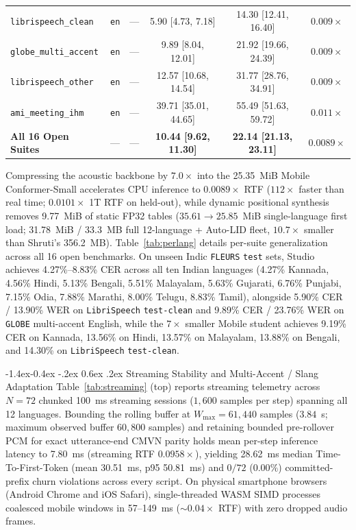 \documentclass[10pt,twocolumn]{article}
\makeatletter
\renewcommand\subsection{\@startsection{subsection}{2}{\z@}%
  {-1.4ex\@plus -0.4ex \@minus -.2ex}%
  {0.6ex \@plus .2ex}%
  {\normalfont\normalsize\bfseries}}
\makeatother
\begin{document}
\begin{table}[t]
{\begin{tabular}{@{}llcccc@{}}
\midrule
\texttt{librispeech\_clean} & \texttt{en} & --- & 5.90 [4.73, 7.18] & 14.30 [12.41, 16.40] & $0.009\times$ \\
\texttt{globe\_multi\_accent} & \texttt{en} & --- & 9.89 [8.04, 12.01] & 21.92 [19.66, 24.39] & $0.009\times$ \\
\texttt{librispeech\_other} & \texttt{en} & --- & 12.57 [10.68, 14.54] & 31.77 [28.76, 34.91] & $0.009\times$ \\
\texttt{ami\_meeting\_ihm} & \texttt{en} & --- & 39.71 [35.01, 44.65] & 55.49 [51.63, 59.72] & $0.011\times$ \\
\midrule
\textbf{All 16 Open Suites} & --- & --- & \textbf{10.44 [9.62, 11.30]} & \textbf{22.14 [21.13, 23.11]} & \textbf{$0.0089\times$} \\
\bottomrule
\end{tabular}%
}
\end{table}

Compressing the acoustic backbone by $7.0\times$ into the 25.35~MiB Mobile Conformer-Small accelerates CPU inference to $0.0089\times$ RTF ($112\times$ faster than real time; $0.0101\times$ 1T RTF on held-out), while dynamic positional synthesis removes 9.77~MiB of static FP32 tables ($35.61 \to 25.85$~MiB single-language first load; 31.78~MiB / 33.3~MB full 12-language + Auto-LID fleet, $10.7\times$ smaller than Shruti's 356.2~MB). Table~\ref{tab:perlang} details per-suite generalization across all 16 open benchmarks. On unseen Indic \texttt{FLEURS} \texttt{test} sets, Studio achieves 4.27\%--8.83\% CER across all ten Indian languages (4.27\% Kannada, 4.56\% Hindi, 5.13\% Bengali, 5.51\% Malayalam, 5.63\% Gujarati, 6.76\% Punjabi, 7.15\% Odia, 7.88\% Marathi, 8.00\% Telugu, 8.83\% Tamil), alongside 5.90\% CER / 13.90\% WER on \texttt{LibriSpeech} \texttt{test-clean} and 9.89\% CER / 23.76\% WER on \texttt{GLOBE} multi-accent English, while the $7\times$ smaller Mobile student achieves 9.19\% CER on Kannada, 13.56\% on Hindi, 13.57\% on Malayalam, 13.88\% on Bengali, and 14.30\% on \texttt{LibriSpeech} \texttt{test-clean}.

\subsection{Streaming Stability and Multi-Accent / Slang Adaptation}
Table~\ref{tab:streaming} (top) reports streaming telemetry across $N = 72$ chunked 100~ms streaming sessions ($1{,}600$ samples per step) spanning all 12 languages. Bounding the rolling buffer at $W_{\max} = 61{,}440$ samples ($3.84$~s; maximum observed buffer $60{,}800$ samples) and retaining bounded pre-rollover PCM for exact utterance-end CMVN parity holds mean per-step inference latency to 7.80~ms (streaming RTF $0.0958\times$), yielding 28.62~ms median Time-To-First-Token (mean 30.51~ms, p95 50.81~ms) and $0 / 72$ ($0.00\%$) committed-prefix churn violations across every script. On physical smartphone browsers (Android Chrome and iOS Safari), single-threaded WASM SIMD processes coalesced mobile windows in 57--149~ms ($\sim 0.04\times$ RTF) with zero dropped audio frames.
\end{document}
